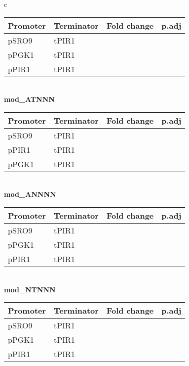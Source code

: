 \documentclass[../main.tex]{subfiles}
\begin{document}
\begin{table}[ph!]
{\begin{tabular}{ c }
\begin{tabularx}{0.8\textwidth} { 
  | >{\centering\arraybackslash}X 
  | >{\centering\arraybackslash}X  
  | >{\centering\arraybackslash}X
  | >{\centering\arraybackslash}X | }
\hline
\textbf{Promoter} & \textbf{Terminator} & \textbf{Fold change} & \textbf{p.adj}\\
\hline
pSRO9 & tPIR1 & 0.9330330 & 0.73\\
\hline
pPGK1 & tPIR1 & 0.9777246 & 0.81\\
\hline
pPIR1 & tPIR1 & 1.0788127 & 0.67\\
\hline
\end{tabularx} \\
\textbf{mod\_ATNNN} \\
\begin{tabularx}{0.8\textwidth} { 
  | >{\centering\arraybackslash}X 
  | >{\centering\arraybackslash}X  
  | >{\centering\arraybackslash}X
  | >{\centering\arraybackslash}X | }
\hline
\textbf{Promoter} & \textbf{Terminator} & \textbf{Fold change} & \textbf{p.adj}\\
\hline
pSRO9 & tPIR1 & 1.161598 & 0.230\\
\hline
pPIR1 & tPIR1 & 1.209994 & 0.180\\
\hline
pPGK1 & tPIR1 & 1.267952 & 0.018\\
\hline
\end{tabularx} \\
\textbf{mod\_ANNNN} \\
\begin{tabularx}{0.8\textwidth} { 
  | >{\centering\arraybackslash}X 
  | >{\centering\arraybackslash}X  
  | >{\centering\arraybackslash}X
  | >{\centering\arraybackslash}X | }
\hline
\textbf{Promoter} & \textbf{Terminator} & \textbf{Fold change} & \textbf{p.adj}\\
\hline
pSRO9 & tPIR1 & 1.482810 & 0.0200\\
\hline
pPGK1 & tPIR1 & 1.599674 & 0.0015\\
\hline
pPIR1 & tPIR1 & 2.126692 & 0.0002\\
\hline
\end{tabularx} \\
\textbf{mod\_NTNNN}  \\
\begin{tabularx}{0.8\textwidth} { 
  | >{\centering\arraybackslash}X 
  | >{\centering\arraybackslash}X  
  | >{\centering\arraybackslash}X
  | >{\centering\arraybackslash}X | }
\hline
\textbf{Promoter} & \textbf{Terminator} & \textbf{Fold change} & \textbf{p.adj}\\
\hline
pSRO9 & tPIR1 & 1.287386 & 0.0460\\
\hline
pPGK1 & tPIR1 & 1.578562 & 0.0004\\
\hline
pPIR1 & tPIR1 & 1.685034 & 0.0038\\

\end{tabularx}
\end{tabular}}
\end{table}
\end{document}
